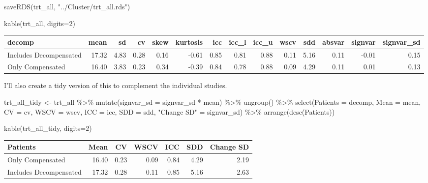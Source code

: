 \documentclass[
]{article}
\newenvironment{Shaded}{\begin{snugshade}}{\end{snugshade}}
\newcommand{\AttributeTok}[1]{\textcolor[rgb]{0.77,0.63,0.00}{#1}}
\newcommand{\DecValTok}[1]{\textcolor[rgb]{0.00,0.00,0.81}{#1}}
\newcommand{\FunctionTok}[1]{\textcolor[rgb]{0.00,0.00,0.00}{#1}}
\newcommand{\NormalTok}[1]{#1}
\newcommand{\OtherTok}[1]{\textcolor[rgb]{0.56,0.35,0.01}{#1}}
\newcommand{\SpecialCharTok}[1]{\textcolor[rgb]{0.00,0.00,0.00}{#1}}
\newcommand{\StringTok}[1]{\textcolor[rgb]{0.31,0.60,0.02}{#1}}
\begin{document}
\begin{Shaded}
\begin{Highlighting}[]
\FunctionTok{saveRDS}\NormalTok{(trt\_all, }\StringTok{"../Cluster/trt\_all.rds"}\NormalTok{)}

\FunctionTok{kable}\NormalTok{(trt\_all, }\AttributeTok{digits=}\DecValTok{2}\NormalTok{)}
\end{Highlighting}
\end{Shaded}

\begin{tabular}{l|r|r|r|r|r|r|r|r|r|r|r|r|r}
\hline
decomp & mean & sd & cv & skew & kurtosis & icc & icc\_l & icc\_u & wscv & sdd & absvar & signvar & signvar\_sd\\
\hline
Includes Decompensated & 17.32 & 4.83 & 0.28 & 0.16 & -0.61 & 0.85 & 0.81 & 0.88 & 0.11 & 5.16 & 0.11 & -0.01 & 0.15\\
\hline
Only Compensated & 16.40 & 3.83 & 0.23 & 0.34 & -0.39 & 0.84 & 0.78 & 0.88 & 0.09 & 4.29 & 0.11 & 0.01 & 0.13\\
\hline
\end{tabular}

I'll also create a tidy version of this to complement the individual
studies.

\begin{Shaded}
\begin{Highlighting}[]
\NormalTok{trt\_all\_tidy }\OtherTok{\textless{}{-}}\NormalTok{ trt\_all }\SpecialCharTok{\%\textgreater{}\%} 
  \FunctionTok{mutate}\NormalTok{(}\AttributeTok{signvar\_sd =}\NormalTok{ signvar\_sd }\SpecialCharTok{*}\NormalTok{ mean) }\SpecialCharTok{\%\textgreater{}\%} 
  \FunctionTok{ungroup}\NormalTok{() }\SpecialCharTok{\%\textgreater{}\%} 
  \FunctionTok{select}\NormalTok{(}\AttributeTok{Patients =}\NormalTok{ decomp, }
         \AttributeTok{Mean =}\NormalTok{ mean, }\AttributeTok{CV =}\NormalTok{ cv, }
         \AttributeTok{WSCV =}\NormalTok{ wscv, }\AttributeTok{ICC =}\NormalTok{ icc,}
         \AttributeTok{SDD =}\NormalTok{ sdd,}
         \StringTok{"Change SD"} \OtherTok{=}\NormalTok{ signvar\_sd) }\SpecialCharTok{\%\textgreater{}\%} 
  \FunctionTok{arrange}\NormalTok{(}\FunctionTok{desc}\NormalTok{(Patients))}

\FunctionTok{kable}\NormalTok{(trt\_all\_tidy, }\AttributeTok{digits=}\DecValTok{2}\NormalTok{)}
\end{Highlighting}
\end{Shaded}

\begin{tabular}{l|r|r|r|r|r|r}
\hline
Patients & Mean & CV & WSCV & ICC & SDD & Change SD\\
\hline
Only Compensated & 16.40 & 0.23 & 0.09 & 0.84 & 4.29 & 2.19\\
\hline
Includes Decompensated & 17.32 & 0.28 & 0.11 & 0.85 & 5.16 & 2.63\\
\hline
\end{tabular}
\end{document}
